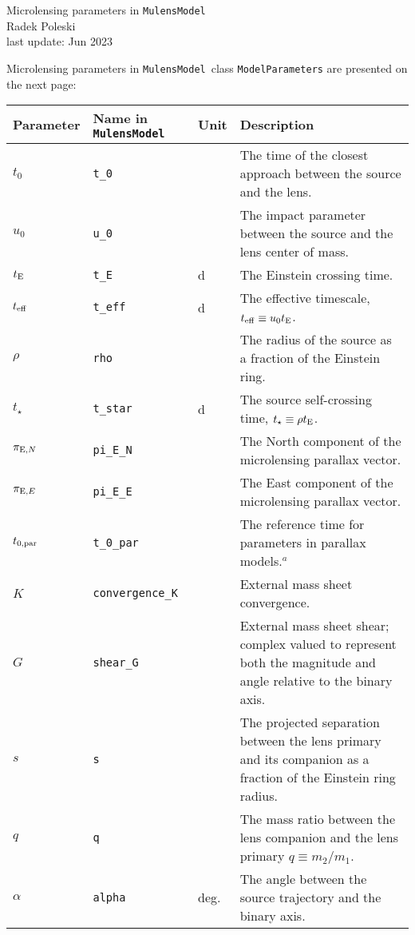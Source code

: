 \documentclass[12pt]{article}
\newcommand\MM{{\tt MulensModel}}
\begin{document}

\begin{center}
{\LARGE Microlensing parameters in \MM}\\
\bigskip
Radek Poleski\\
last update: Jun 2023
\end{center}

\bigskip
Microlensing parameters in \MM\, class {\tt ModelParameters} are presented on the next page:

\begin{landscape}
\captionsetup{width=20cm}
\begin{longtable}{l l l p{12cm}}
Parameter & Name in \MM &  Unit & Description \\
\hline
$t_0$ & {\tt t\_0} & & The time of the closest approach between the source and the lens. \\
$u_0$ & {\tt u\_0} & & The impact parameter between the source and the lens center of mass. \\
$t_{\rm E}$ & {\tt t\_E} & d & The Einstein crossing time. \\
$t_{\rm eff}$ & {\tt t\_eff} & d & The effective timescale, $t_{\rm eff} \equiv u_0 t_{\rm E}$. \\
$\rho$ & {\tt rho} & & The radius of the source as a fraction of the Einstein ring. \\
$t_{\star}$ & {\tt t\_star} & d & The source self-crossing time, $t_\star \equiv \rho t_{\rm E}$. \\
$\pi_{{\rm E}, N}$ & {\tt pi\_E\_N} & & The North component of the microlensing parallax vector. \\
$\pi_{{\rm E}, E}$ & {\tt pi\_E\_E} & & The East component of the microlensing parallax vector. \\
$t_{0,{\rm par}}$ & {\tt t\_0\_par} & & The reference time for parameters in parallax models.$^a$ \\
$K$ & {\tt convergence\_K} & & External mass sheet convergence. \\
$G$ & {\tt shear\_G} & & External mass sheet shear; complex valued to represent both the magnitude and angle relative to the binary axis. \\
$s$ & {\tt s} & & The projected separation between the lens primary and its companion as a fraction of the Einstein ring radius. \\
$q$ & {\tt q} & & The mass ratio between the lens companion and the lens primary $q \equiv m_2/m_1$. \\
$\alpha$ & {\tt alpha} & deg. & The angle between the source trajectory and the binary axis. \\

\end{longtable}
\end{landscape}
\end{document}
